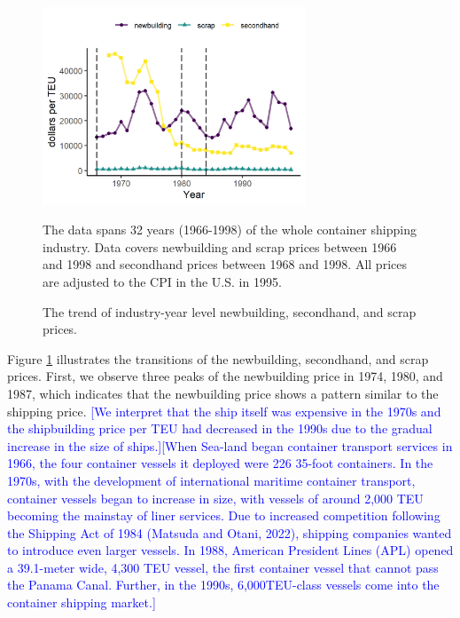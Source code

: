 \documentclass[11pt]{article}
\begin{document}
\begin{figure}[!ht]
\begin{center}
\includegraphics[width = 0.7\textwidth]{figuretable/price_newbuilding_secondhand_scrap.png}
\caption{The trend of industry-year level newbuilding, secondhand, and scrap prices.}
\label{fg:price_newbuilding_secondhand_scrap}
\end{center}
\footnotesize
The data spans 32 years (1966-1998) of the whole container shipping industry. Data covers newbuilding and scrap prices between 1966 and 1998 and secondhand prices between 1968 and 1998. All prices are adjusted to the CPI in the U.S. in 1995. 
\end{figure}

Figure \ref{fg:price_newbuilding_secondhand_scrap} illustrates the transitions of the newbuilding, secondhand, and scrap prices. First, we observe three peaks of the newbuilding price in 1974, 1980, and 1987, which indicates that the newbuilding price shows a pattern similar to the shipping price. \textcolor{blue}{[We interpret that the ship itself was expensive in the 1970s and the shipbuilding price per TEU had decreased in the 1990s due to the gradual increase in the size of ships.]}\textcolor{blue}{[When Sea-land began container transport services in 1966, the four container vessels it deployed were 226 35-foot containers. In the 1970s, with the development of international maritime container transport, container vessels began to increase in size, with vessels of around 2,000 TEU becoming the mainstay of liner services. Due to increased competition following the Shipping Act of 1984 (Matsuda and Otani, 2022), shipping companies wanted to introduce even larger vessels. In 1988, American President Lines (APL) opened a 39.1-meter wide, 4,300 TEU vessel, the first container vessel that cannot pass the Panama Canal. Further, in the 1990s, 6,000TEU-class vessels come into the container shipping market.]}
\end{document}
